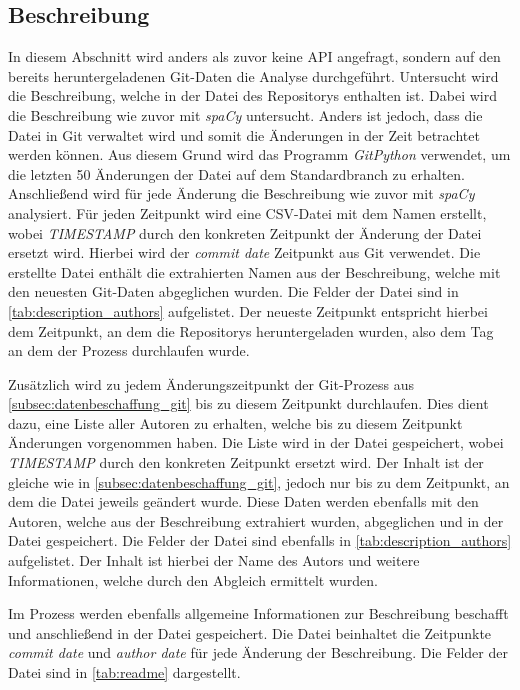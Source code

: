 \subsection{Beschreibung}
\label{subsec:datenbeschaffung_beschreibung}
In diesem Abschnitt wird anders als zuvor keine API angefragt, sondern auf den bereits heruntergeladenen Git-Daten die Analyse durchgeführt.
Untersucht wird die Beschreibung, welche in der  Datei des Repositorys enthalten ist.
Dabei wird die Beschreibung wie zuvor mit \emph{spaCy} untersucht.
Anders ist jedoch, dass die  Datei in Git verwaltet wird und somit die Änderungen in der Zeit betrachtet werden können.
Aus diesem Grund wird das Programm \emph{GitPython} verwendet, um die letzten 50 Änderungen der Datei auf dem Standardbranch zu erhalten.
Anschließend wird für jede Änderung die Beschreibung wie zuvor mit \emph{spaCy} analysiert.
Für jeden Zeitpunkt wird eine CSV-Datei mit dem Namen  erstellt, wobei \emph{TIMESTAMP} durch den konkreten Zeitpunkt der Änderung der Datei ersetzt wird.
Hierbei wird der \emph{commit date} Zeitpunkt aus Git verwendet.
Die erstellte Datei enthält die extrahierten Namen aus der Beschreibung, welche mit den neuesten Git-Daten abgeglichen wurden.
Die Felder der Datei sind in \autoref{tab:description_authors} aufgelistet.
Der neueste Zeitpunkt entspricht hierbei dem Zeitpunkt, an dem die Repositorys heruntergeladen wurden, also dem Tag an dem der Prozess durchlaufen wurde.

Zusätzlich wird zu jedem Änderungszeitpunkt der Git-Prozess aus \autoref{subsec:datenbeschaffung_git} bis zu diesem Zeitpunkt durchlaufen.
Dies dient dazu, eine Liste aller Autoren zu erhalten, welche bis zu diesem Zeitpunkt Änderungen vorgenommen haben.
Die Liste wird in der Datei  gespeichert, wobei \emph{TIMESTAMP} durch den konkreten Zeitpunkt ersetzt wird.
Der Inhalt ist der gleiche wie in \autoref{subsec:datenbeschaffung_git}, jedoch nur bis zu dem Zeitpunkt, an dem die  Datei jeweils geändert wurde.
Diese Daten werden ebenfalls mit den Autoren, welche aus der Beschreibung extrahiert wurden, abgeglichen und in der Datei  gespeichert.
Die Felder der Datei sind ebenfalls in \autoref{tab:description_authors} aufgelistet.
Der Inhalt ist hierbei der Name des Autors und weitere Informationen, welche durch den Abgleich ermittelt wurden.

Im Prozess werden ebenfalls allgemeine Informationen zur Beschreibung beschafft und anschließend in der Datei  gespeichert.
Die Datei beinhaltet die Zeitpunkte \emph{commit date} und \emph{author date} für jede Änderung der Beschreibung.
Die Felder der Datei sind in \autoref{tab:readme} dargestellt.

